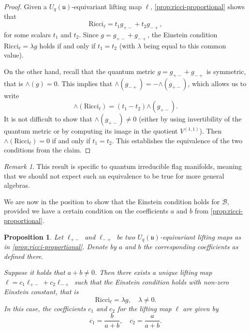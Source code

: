 \documentclass[a4paper,12pt,reqno,english]{amsart}
\numberwithin{equation}{section}
\numberwithin{figure}{section}
\theoremstyle{plain}
\theoremstyle{plain}
\theoremstyle{plain}
\newtheorem{proposition}[theorem]{Proposition}
\theoremstyle{plain}
\theoremstyle{plain}
\theoremstyle{definition}
\theoremstyle{definition}
\theoremstyle{definition}
\theoremstyle{remark}
\newtheorem{remark}[theorem]{Remark}
\theoremstyle{definition}
\newcommand{\Uqu}{U_q(\mathfrak{u})}
\newcommand{\qalg}{\mathcal{B}}
\newcommand{\Ricci}{\mathrm{Ricci}}
\newcommand{\liftmap}{\ell}
\newcommand{\wedgemap}{\mathord{\wedge}}
\begin{document}
\begin{proof}
Given a $\Uqu$-equivariant lifting map $\liftmap$, \cref{prop:ricci-proportional} shows that
\[
\Ricci_\liftmap = t_1 g_{+ -} + t_2 g_{- +},
\]
for some scalars $t_1$ and $t_2$.
Since $g = g_{+ -} + g_{- +}$, 
the Einstein condition $\Ricci_\liftmap = \lambda g$ holds if and only if $t_1 = t_2$ (with $\lambda$ being equal to this common value).

On the other hand, recall that the quantum metric $g = g_{+ -} + g_{- +}$ is symmetric, that is $\wedgemap(g) = 0$.
This implies that $\wedgemap(g_{- +}) = - \wedgemap(g_{+ -})$, which allows us to write
\[
\wedgemap(\Ricci_\liftmap) = (t_1 - t_2) \wedgemap(g_{+ -}).
\]
It is not difficult to show that $\wedgemap(g_{+ -}) \neq 0$ (either by using invertibility of the quantum metric or by computing its image in the quotient $V^{(1, 1)}$).
Then $\wedgemap(\Ricci_\liftmap) = 0$ if and only if $t_1 = t_2$.
This establishes the equivalence of the two conditions from the claim.
\end{proof}

\begin{remark}
This result is specific to quantum irreducible flag manifolds, meaning that we should not expect such an equivalence to be true for more general algebras.
\end{remark}

We are now in the position to show that the Einstein condition holds for $\qalg$, provided we have a certain condition on the coefficients $a$ and $b$ from \cref{prop:ricci-proportional}.

\begin{proposition}
\label{prop:einstein-condition}
Let $\liftmap_{+ -}$ and $\liftmap_{- +}$ be two $\Uqu$-equivariant lifting maps as in \cref{prop:ricci-proportional}.
Denote by $a$ and $b$ the corresponding coefficients as defined there.

Suppose it holds that $a + b \neq 0$.
Then there exists a unique lifting map $\liftmap = c_1 \liftmap_{+ -} + c_2 \liftmap_{- +}$ such that the Einstein condition holds with non-zero Einstein constant, that is
\[
\Ricci_\liftmap = \lambda g, \quad \lambda \neq 0.
\]
In this case, the coefficients $c_1$ and $c_2$ for the lifting map $\liftmap$ are given by
\[
c_1 = \frac{b}{a + b}, \quad
c_2 = \frac{a}{a + b}.
\]
\end{proposition}
\end{document}
